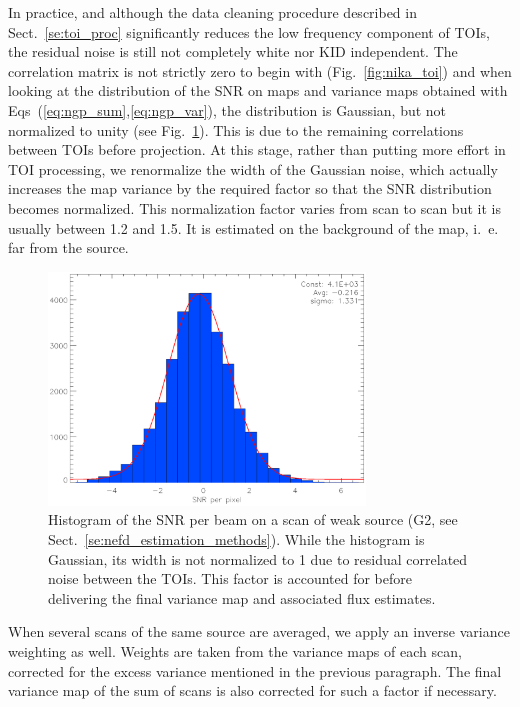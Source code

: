 In practice, and although the data cleaning procedure described in
Sect.~\ref{se:toi_proc} significantly reduces the low frequency component of
TOIs, the residual noise is still not completely white nor KID independent. The
correlation matrix is not strictly zero to begin with (Fig.~\ref{fig:nika_toi})
and when looking at the distribution of the SNR on maps and variance maps
obtained with Eqs~(\ref{eq:ngp_sum},\ref{eq:ngp_var}), the distribution is
Gaussian, but not normalized to unity (see Fig.~\ref{fig:sigma_boost}). This is
due to the remaining correlations between TOIs before projection. At this stage,
rather than putting more effort in TOI processing, we renormalize the width of
the Gaussian noise, which actually increases the map variance by the required factor
so that the SNR distribution becomes normalized. This normalization factor
varies from scan to scan but it is usually between 1.2 and 1.5. It is estimated on
the background of the map, i.~e. far from the source.

\begin{figure}[ht!]
\begin{center}
\includegraphics[clip, angle=0, scale=1, width=0.75\textwidth]{Figures/sigma_boost.eps}
\caption[Distribution of the SNR per beam]{Histogram of the SNR per beam on a scan of weak source (G2, see
  Sect.~\ref{se:nefd_estimation_methods}). While the histogram is Gaussian, its
  width is not normalized to 1 due to residual correlated noise between the
  TOIs. This factor is accounted for before delivering the final variance map
  and associated flux estimates.}
\label{fig:sigma_boost}
\end{center}
\end{figure}

When several scans of the same source are averaged, we apply an inverse
variance weighting as well. Weights are taken from the variance maps of each scan,
corrected for the excess variance mentioned in the previous paragraph. The
final variance map of the sum of scans is also corrected for such a factor if necessary.

